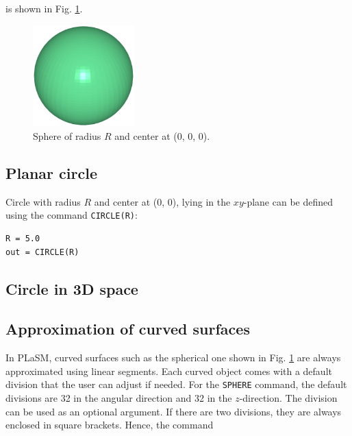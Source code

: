 \noindent
is shown in Fig. \ref{fig:sphere-1}.

\begin{figure}[!ht]
\begin{center}
\includegraphics[width=0.35\textwidth]{img/sphere-1.png}
\end{center}
\vspace{-4mm}
\caption{Sphere of radius $R$ and center at (0, 0, 0).}
\label{fig:sphere-1}
\vspace{-1cm}
\end{figure}

\subsection{Planar circle}


Circle with radius $R$ and center at (0, 0), lying in the $xy$-plane 
can be defined using the command {\tt CIRCLE(R)}:\\

\begin{bbox}
\begin{verbatim}
R = 5.0
out = CIRCLE(R)
\end{verbatim}
\end{bbox}
\vspace{6mm}

\noindent

\subsection{Circle in 3D space}


\subsection{Approximation of curved surfaces} 

In PLaSM, curved surfaces such as the spherical one shown in Fig. \ref{fig:sphere-1}
are always approximated using linear segments. Each curved object comes
with a default division that the user can adjust if needed. For the 
{\tt SPHERE} command, the default divisions are 32 in the angular direction 
and 32 in the $z$-direction. The division can be used as an optional argument.
If there are two divisions, they are always enclosed in square brackets. Hence, 
the command\\

